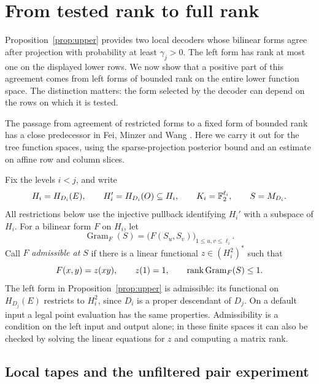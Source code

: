 \section{From tested rank to full rank}\label{sec:lower}

Proposition~\ref{prop:upper} provides two local decoders whose bilinear
forms agree after projection with probability at least $\gamma_j>0$.
The left form has rank at most one on the displayed lower rows.  We now
show that a positive part of this agreement comes from left forms of
bounded rank on the entire lower function space.  The distinction matters:
the form selected by the decoder can depend on the rows on which it is
tested.

The passage from agreement of restricted forms to a fixed form of bounded
rank has a close predecessor in Fei, Minzer and Wang
\cite[Lemmas~5.15--5.16]{FeiMinzerWang2026}.  Here we carry it out for the
tree function spaces, using the sparse-projection posterior bound and
an estimate on affine row and column slices.

Fix the levels $i<j$, and write
\[
 H_i=H_{D_i}(E),\qquad H_i'=H_{D_i}(O)\subseteq H_i,
 \qquad K_i=\mathbb F_2^{\ell_i},\qquad S=M_{D_i}.
\]
All restrictions below use the injective pullback identifying $H_i'$ with
a subspace of $H_i$.  For a bilinear form $F$ on $H_i$, let
\[
 \operatorname{Gram}_F(S)
       =\bigl(F(S_u,S_v)\bigr)_{1\leq u,v\leq\ell_i}.
\]
Call $F$ \emph{admissible at $S$} if there is a linear functional
$z\in(H_i^2)^*$ such that
\begin{equation}\label{eq:lower-admissible}
 F(x,y)=z(xy),\qquad z(1)=1,\qquad
 \operatorname{rank}\operatorname{Gram}_F(S)\leq1.
\end{equation}
The left form in Proposition~\ref{prop:upper} is admissible: its functional
on $H_{D_j}(E)$ restricts to $H_i^2$, since $D_i$ is a proper descendant
of $D_j$.  On a default input a legal point evaluation has the same
properties.  Admissibility is a condition on the left input and output
alone; in these finite spaces it can also be checked by solving the
linear equations for $z$ and computing a matrix rank.

\subsection{Local tapes and the unfiltered pair experiment}

